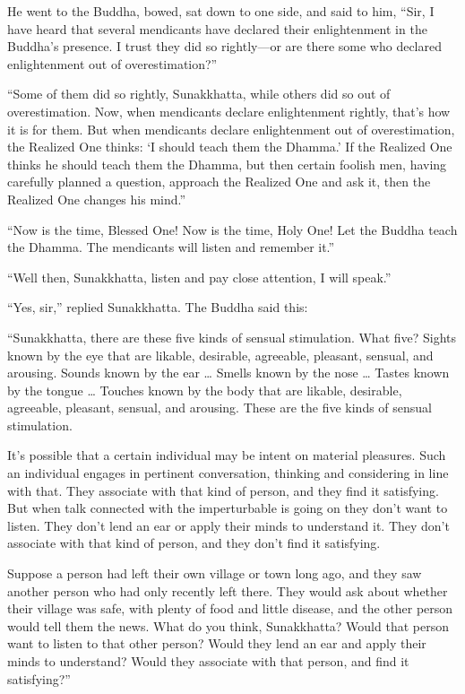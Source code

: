 \documentclass[12pt,openany]{book}%
\begin{document}
He went to the Buddha, bowed, sat down to one side, and said to him, “Sir, I have heard that several mendicants have declared their enlightenment in the Buddha’s presence. I trust they did so rightly—or are there some who declared enlightenment out of overestimation?” 

“Some of them did so rightly, Sunakkhatta, while others did so out of overestimation. Now, when mendicants declare enlightenment rightly, that’s how it is for them. But when mendicants declare enlightenment out of overestimation, the Realized One thinks: ‘I should teach them the Dhamma.’ If the Realized One thinks he should teach them the Dhamma, but then certain foolish men, having carefully planned a question, approach the Realized One and ask it, then the Realized One changes his mind.” 

“Now is the time, Blessed One! Now is the time, Holy One! Let the Buddha teach the Dhamma. The mendicants will listen and remember it.” 

“Well then, Sunakkhatta, listen and pay close attention, I will speak.” 

“Yes, sir,” replied Sunakkhatta. The Buddha said this: 

“Sunakkhatta, there are these five kinds of sensual stimulation. What five? Sights known by the eye that are likable, desirable, agreeable, pleasant, sensual, and arousing. Sounds known by the ear … Smells known by the nose … Tastes known by the tongue … Touches known by the body that are likable, desirable, agreeable, pleasant, sensual, and arousing. These are the five kinds of sensual stimulation. 

It’s possible that a certain individual may be intent on material pleasures. Such an individual engages in pertinent conversation, thinking and considering in line with that. They associate with that kind of person, and they find it satisfying. But when talk connected with the imperturbable is going on they don’t want to listen. They don’t lend an ear or apply their minds to understand it. They don’t associate with that kind of person, and they don’t find it satisfying. 

Suppose a person had left their own village or town long ago, and they saw another person who had only recently left there. They would ask about whether their village was safe, with plenty of food and little disease, and the other person would tell them the news. What do you think, Sunakkhatta? Would that person want to listen to that other person? Would they lend an ear and apply their minds to understand? Would they associate with that person, and find it satisfying?” 
\end{document}
